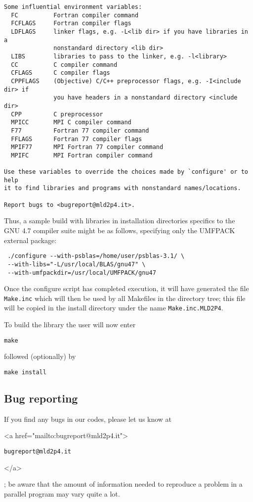 \begin{verbatim}
Some influential environment variables:
  FC          Fortran compiler command
  FCFLAGS     Fortran compiler flags
  LDFLAGS     linker flags, e.g. -L<lib dir> if you have libraries in a
              nonstandard directory <lib dir>
  LIBS        libraries to pass to the linker, e.g. -l<library>
  CC          C compiler command
  CFLAGS      C compiler flags
  CPPFLAGS    (Objective) C/C++ preprocessor flags, e.g. -I<include dir> if
              you have headers in a nonstandard directory <include dir>
  CPP         C preprocessor
  MPICC       MPI C compiler command
  F77         Fortran 77 compiler command
  FFLAGS      Fortran 77 compiler flags
  MPIF77      MPI Fortran 77 compiler command
  MPIFC       MPI Fortran compiler command

Use these variables to override the choices made by `configure' or to help
it to find libraries and programs with nonstandard names/locations.

Report bugs to <bugreport@mld2p4.it>.
\end{verbatim}
Thus, a sample build with libraries in installation
directories specifics to the GNU 4.7 compiler suite might be as
follows, specifying only the UMFPACK external package: 
\begin{verbatim}
 ./configure --with-psblas=/home/user/psblas-3.1/ \
 --with-libs="-L/usr/local/BLAS/gnu47" \
 --with-umfpackdir=/usr/local/UMFPACK/gnu47 
\end{verbatim}
Once the configure script has completed execution, it will have
generated the file \verb|Make.inc| which will then be used by all
Makefiles in the directory tree; this file will be copied in the
install directory under the name \verb|Make.inc.MLD2P4|.

To build the library the user will now enter 
\begin{verbatim}
make
\end{verbatim}
followed (optionally) by 
\begin{verbatim}
make install
\end{verbatim}
\subsection{Bug reporting}
If you find any bugs in our codes, please let us know at
\begin{rawhtml}
<a href="mailto:bugreport@mld2p4.it">
\end{rawhtml}
\texttt{bugreport@mld2p4.it}
\begin{rawhtml}
</a>
\end{rawhtml}
; be aware that  
the amount of information needed to reproduce a problem in a parallel
program may vary quite a lot. 
